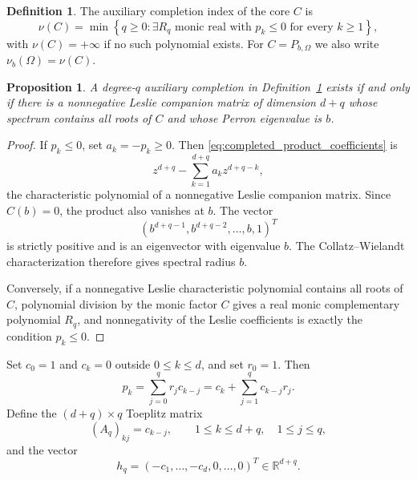 \documentclass[11pt]{amsart}
\numberwithin{equation}{section}
\theoremstyle{plain}
\newtheorem{proposition}[theorem]{Proposition}
\theoremstyle{definition}
\newtheorem{definition}[theorem]{Definition}
\theoremstyle{remark}
\begin{document}
\begin{definition}
\label{def:auxiliary_completion_index}
The auxiliary completion index of the core $C$ is
\begin{equation}
\nu(C)
=
\min\left\{
q\geq0:
\exists R_q\text{ monic real with }p_k\leq0\text{ for every }k\geq1
\right\},
\label{eq:auxiliary_completion_index}
\end{equation}
with $\nu(C)=+\infty$ if no such polynomial exists.  For $C=P_{b,\Omega}$ we also write $\nu_b(\Omega)=\nu(C)$.
\end{definition}

\begin{proposition}
\label{prop:completion_equivalence}
A degree-$q$ auxiliary completion in Definition~\ref{def:auxiliary_completion_index} exists if and only if there is a nonnegative Leslie companion matrix of dimension $d+q$ whose spectrum contains all roots of $C$ and whose Perron eigenvalue is $b$.
\end{proposition}

\begin{proof}
If $p_k\leq0$, set $a_k=-p_k\geq0$.  Then \eqref{eq:completed_product_coefficients} is
\[
z^{d+q}-\sum_{k=1}^{d+q}a_k z^{d+q-k},
\]
the characteristic polynomial of a nonnegative Leslie companion matrix.  Since $C(b)=0$, the product also vanishes at $b$.  The vector
\[
(b^{d+q-1},b^{d+q-2},\ldots,b,1)^T
\]
is strictly positive and is an eigenvector with eigenvalue $b$.  The Collatz--Wielandt characterization therefore gives spectral radius $b$.

Conversely, if a nonnegative Leslie characteristic polynomial contains all roots of $C$, polynomial division by the monic factor $C$ gives a real monic complementary polynomial $R_q$, and nonnegativity of the Leslie coefficients is exactly the condition $p_k\leq0$.
\end{proof}

Set $c_0=1$ and $c_k=0$ outside $0\leq k\leq d$, and set $r_0=1$.  Then
\begin{equation}
p_k
=
\sum_{j=0}^{q}r_jc_{k-j}
=
c_k+\sum_{j=1}^{q}c_{k-j}r_j.
\label{eq:product_convolution}
\end{equation}
Define the $(d+q)\times q$ Toeplitz matrix
\begin{equation}
(A_q)_{kj}=c_{k-j},
\qquad
1\leq k\leq d+q,
\quad 1\leq j\leq q,
\label{eq:completion_toeplitz_matrix}
\end{equation}
and the vector
\begin{equation}
h_q=(-c_1,\ldots,-c_d,0,\ldots,0)^T\in\mathbb R^{d+q}.
\label{eq:completion_rhs}
\end{equation}
\end{document}
